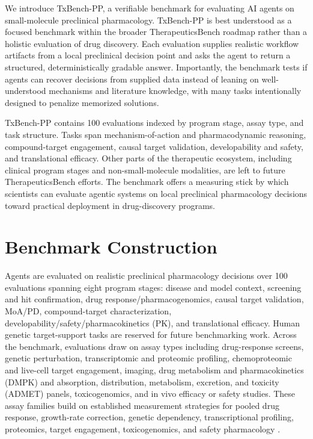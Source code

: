 \documentclass[10pt,letterpaper]{article}
\begin{document}
{\begin{minipage}[t]{0.47\textwidth}
\TwoColParaBreak
We introduce TxBench-PP, a verifiable benchmark for evaluating AI agents on
small-molecule preclinical pharmacology. TxBench-PP is best understood as a
focused benchmark within the broader TherapeuticsBench roadmap rather than a
holistic evaluation of drug discovery. Each evaluation supplies
realistic workflow artifacts from a local preclinical decision point and asks
the agent to return a structured, deterministically gradable answer.
Importantly, the benchmark tests if agents can recover decisions from supplied
data instead of leaning on well-understood mechanisms and literature knowledge,
with many tasks intentionally designed to penalize memorized solutions.

\TwoColParaBreak
TxBench-PP contains 100 evaluations indexed by program stage, assay type, and
task structure. Tasks span mechanism-of-action and pharmacodynamic reasoning,
compound-target engagement, causal target validation, developability and safety,
and translational efficacy. Other parts of the therapeutic ecosystem, including
clinical program stages and non-small-molecule modalities, are left to future
TherapeuticsBench efforts. The benchmark offers a measuring stick by which
scientists can evaluate agentic systems on local preclinical pharmacology
decisions toward practical deployment in drug-discovery programs.

\end{minipage}\hfill
\begin{minipage}[t]{0.47\textwidth}
\setlength{\parskip}{0pt}
\setlength{\parindent}{0pt}

\section{Benchmark Construction}

Agents are evaluated on realistic preclinical pharmacology decisions over 100
evaluations spanning eight program stages: disease and model context, screening
and hit confirmation, drug response/pharmacogenomics, causal target validation,
MoA/PD, compound-target characterization, developability/safety/pharmacokinetics
(PK), and translational efficacy. Human genetic target-support tasks are
reserved for future benchmarking work. Across the benchmark, evaluations draw on assay types
including drug-response screens, genetic perturbation, transcriptomic and
proteomic profiling, chemoproteomic and live-cell target engagement, imaging,
drug metabolism and pharmacokinetics (DMPK) and absorption, distribution,
metabolism, excretion, and toxicity (ADMET) panels, toxicogenomics, and in vivo
efficacy or safety studies. These assay families build on established
measurement strategies for pooled drug response, growth-rate correction,
genetic dependency, transcriptional profiling, proteomics, target engagement,
toxicogenomics, and safety pharmacology
\cite{yu2016,corsello2020,hafner2016,meyers2017,pacini2021,subramanian2017,thompson2003,gerritsen2021,bantscheff2007,klaeger2017,martinezmolina2013,savitski2014,vasta2018,huang2016,igarashi2015,redfern2003,gintant2016}.


\end{minipage}}
\end{document}
